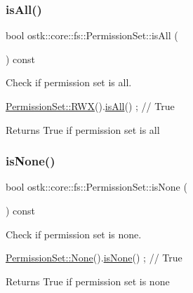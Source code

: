 \subsubsection{\texorpdfstring{is\+All()}{isAll()}}
{\footnotesize\ttfamily bool ostk\+::core\+::fs\+::\+Permission\+Set\+::is\+All (\begin{DoxyParamCaption}{ }\end{DoxyParamCaption}) const}



Check if permission set is all. 


\begin{DoxyCode}
\hyperlink{classostk_1_1core_1_1fs_1_1_permission_set_a9298592527e35edb785430f03e83e79f}{PermissionSet::RWX}().\hyperlink{classostk_1_1core_1_1fs_1_1_permission_set_afde0c91f366451887bd3cde612f28045}{isAll}() ; \textcolor{comment}{// True}
\end{DoxyCode}


\begin{DoxyReturn}{Returns}
True if permission set is all 
\end{DoxyReturn}
\mbox{\label{classostk_1_1core_1_1fs_1_1_permission_set_aa0f0e75b5780db4a724918296ba88358}} 
\subsubsection{\texorpdfstring{is\+None()}{isNone()}}
{\footnotesize\ttfamily bool ostk\+::core\+::fs\+::\+Permission\+Set\+::is\+None (\begin{DoxyParamCaption}{ }\end{DoxyParamCaption}) const}



Check if permission set is none. 


\begin{DoxyCode}
\hyperlink{classostk_1_1core_1_1fs_1_1_permission_set_a32af3f0195b5ec761282521823edc12e}{PermissionSet::None}().\hyperlink{classostk_1_1core_1_1fs_1_1_permission_set_aa0f0e75b5780db4a724918296ba88358}{isNone}() ; \textcolor{comment}{// True}
\end{DoxyCode}


\begin{DoxyReturn}{Returns}
True if permission set is none 
\end{DoxyReturn}
\mbox{\label{classostk_1_1core_1_1fs_1_1_permission_set_a32af3f0195b5ec761282521823edc12e}} 
